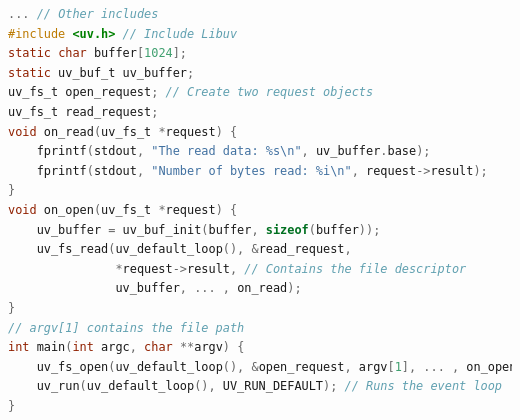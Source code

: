 \begin{lstlisting}[language=C, caption=Libuv example program. \newline Based on https://github.com/nikhilm/uvbook/tree/master/code/uvcat, label=lst:libuv,float,floatplacement=H]
... // Other includes
#include <uv.h> // Include Libuv
static char buffer[1024];
static uv_buf_t uv_buffer;
uv_fs_t open_request; // Create two request objects
uv_fs_t read_request;
void on_read(uv_fs_t *request) {
    fprintf(stdout, "The read data: %s\n", uv_buffer.base);
    fprintf(stdout, "Number of bytes read: %i\n", request->result);
}
void on_open(uv_fs_t *request) {
    uv_buffer = uv_buf_init(buffer, sizeof(buffer));
    uv_fs_read(uv_default_loop(), &read_request,
               *request->result, // Contains the file descriptor
               uv_buffer, ... , on_read);
}
// argv[1] contains the file path
int main(int argc, char **argv) {
    uv_fs_open(uv_default_loop(), &open_request, argv[1], ... , on_open);
    uv_run(uv_default_loop(), UV_RUN_DEFAULT); // Runs the event loop
}
\end{lstlisting}

